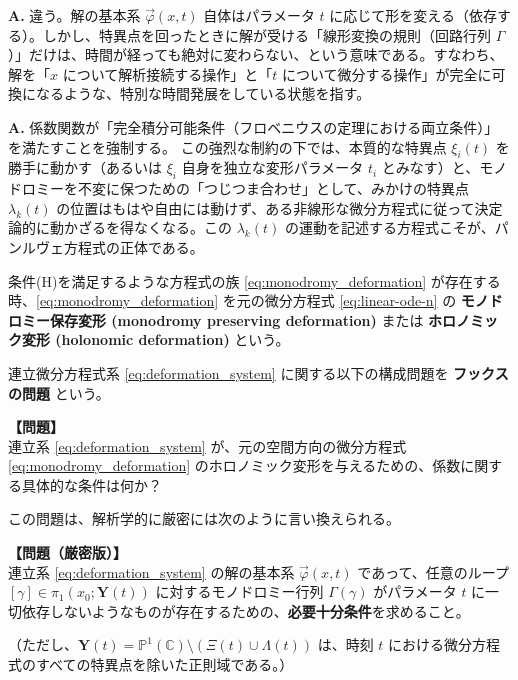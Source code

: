 \begin{Q}
\textbf{A.} 違う。解の基本系 $\vec{\varphi}(x, t)$ 自体はパラメータ $t$ に応じて形を変える（依存する）。しかし、特異点を回ったときに解が受ける「線形変換の規則（回路行列 $\Gamma$）」だけは、時間が経っても絶対に変わらない、という意味である。すなわち、解を「$x$ について解析接続する操作」と「$t$ について微分する操作」が完全に可換になるような、特別な時間発展をしている状態を指す。
\end{Q}

\begin{Q}
\textbf{A.} 係数関数が「完全積分可能条件（フロベニウスの定理における両立条件）」を満たすことを強制する。
この強烈な制約の下では、本質的な特異点 $\xi_i(t)$ を勝手に動かす（あるいは $\xi_i$ 自身を独立な変形パラメータ $t_i$ とみなす）と、モノドロミーを不変に保つための「つじつま合わせ」として、みかけの特異点 $\lambda_k(t)$ の位置はもはや自由には動けず、ある非線形な微分方程式に従って決定論的に動かざるを得なくなる。この $\lambda_k(t)$ の運動を記述する方程式こそが、パンルヴェ方程式の正体である。
\end{Q}

\begin{definition}[モノドロミー保存変形]
    条件(H)を満足するような方程式の族 \eqref{eq:monodromy_deformation} が存在する時、\eqref{eq:monodromy_deformation} を元の微分方程式 \eqref{eq:linear-ode-n} の \textbf{モノドロミー保存変形 (monodromy preserving deformation)} または \textbf{ホロノミック変形 (holonomic deformation)} という。
\end{definition}
\begin{definition}
    連立微分方程式系 \eqref{eq:deformation_system} に関する以下の構成問題を \textbf{フックスの問題} という。

    \textbf{【問題】} \\
    連立系 \eqref{eq:deformation_system} が、元の空間方向の微分方程式 \eqref{eq:monodromy_deformation} のホロノミック変形を与えるための、係数に関する具体的な条件は何か？

    この問題は、解析学的に厳密には次のように言い換えられる。

    \textbf{【問題（厳密版）】} \\
    連立系 \eqref{eq:deformation_system} の解の基本系 $\vec{\varphi}(x,t)$ であって、任意のループ $[\gamma] \in \pi_{1}(x_{0}; \mathbf{Y}(t))$ に対するモノドロミー行列 $\Gamma(\gamma)$ がパラメータ $t$ に一切依存しないようなものが存在するための、\textbf{必要十分条件}を求めること。
    
    （ただし、$\mathbf{Y}(t) = \mathbb{P}^{1}(\mathbb{C}) \setminus (\Xi(t) \cup \Lambda(t))$ は、時刻 $t$ における微分方程式のすべての特異点を除いた正則域である。）
\end{definition}

